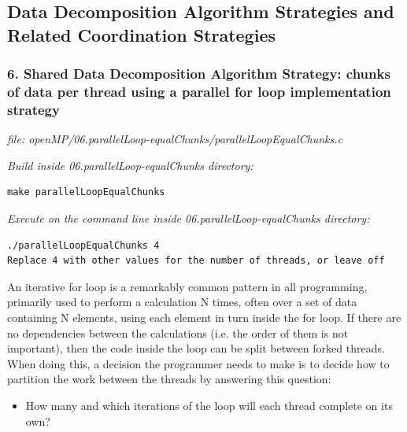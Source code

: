 \documentclass[letterpaper,10pt,openany,oneside]{sphinxmanual}
\begin{document}
\subsection{Data Decomposition Algorithm Strategies and Related Coordination Strategies}
\label{SharedMemory/DataDecomp_Reduction::doc}\label{SharedMemory/DataDecomp_Reduction:data-decomposition-algorithm-strategies-and-related-coordination-strategies}

\subsubsection{6. Shared Data Decomposition Algorithm Strategy:  chunks of data per thread using a parallel for loop implementation strategy}
\label{SharedMemory/DataDecomp_Reduction:shared-data-decomposition-algorithm-strategy-chunks-of-data-per-thread-using-a-parallel-for-loop-implementation-strategy}
\emph{file: openMP/06.parallelLoop-equalChunks/parallelLoopEqualChunks.c}

\emph{Build inside 06.parallelLoop-equalChunks directory:}

\begin{Verbatim}[commandchars=\\\{\}]
make parallelLoopEqualChunks
\end{Verbatim}

\emph{Execute on the command line inside 06.parallelLoop-equalChunks directory:}

\begin{Verbatim}[commandchars=\\\{\}]
./parallelLoopEqualChunks 4
Replace 4 with other values for the number of threads, or leave off
\end{Verbatim}

An iterative for loop is a remarkably common pattern in all programming, primarily used to
perform a calculation N times, often over a set of data containing N elements, using each
element in turn inside the for loop.  If there are no dependencies between the calculations
(i.e. the order of them is not important), then the code inside the loop can be split
between forked threads.  When doing this, a decision the programmer needs to make is to
decide how to partition the work between the threads by answering this question:
\begin{itemize}
\item {} 
How many and which iterations of the loop will each thread complete on its own?

\end{itemize}
\end{document}
